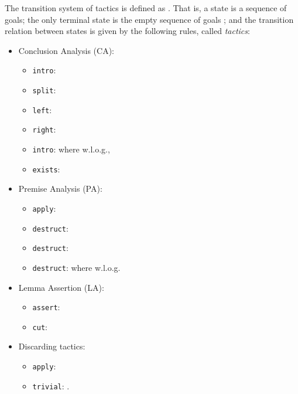 \documentclass[a4paper,UKenglish]{lipics}
\begin{document}
\begin{definition}\label{def:tact}
The transition system of tactics is defined as . That is, a state is a sequence of goals; the only terminal state is the empty sequence of goals  ; and the transition relation  between states is given by the following rules, called {\em tactics}:
\begin{itemize}
\item Conclusion Analysis (CA):
  \begin{itemize}
		\item {\tt intro}: 
		\vspace{0.2cm}
		\item {\tt split}: 
		\vspace{0.2cm}
		\item {\tt left}: 
		\vspace{0.2cm}
		\item {\tt right}: 
		\vspace{0.2cm} 
              \item {\tt intro}:  where  
w.l.o.g., 
	\vspace{0.2cm}
	\item {\tt exists}:  
\end{itemize}
	\vspace{0.2cm}
\item Premise Analysis (PA):
\begin{itemize}
	\item {\tt apply}: 
\vspace{0.2cm}
	\item {\tt destruct}: 
	\vspace{0.2cm}
	\item {\tt destruct}: 

	\vspace{0.2cm}
	\item {\tt destruct}:  
where w.l.o.g. 
\end{itemize}

\item Lemma Assertion (LA): 
\begin{itemize}
	\item {\tt assert}: 
	\vspace{0.2cm}
	\item {\tt cut}: 
	\end{itemize}

\item Discarding tactics:
\begin{itemize}
	\item {\tt apply}: 
	\vspace{0.2cm}
	\item {\tt trivial}: . 
	\vspace{0.2cm}

\end{itemize}
\end{itemize}
\end{definition}
\end{document}
